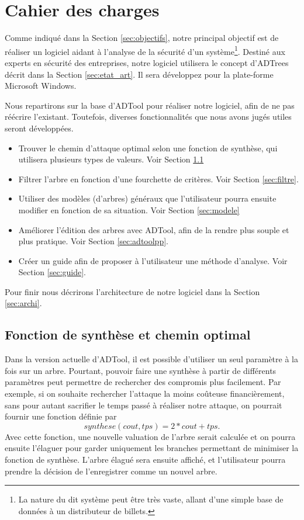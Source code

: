 \section{Cahier des charges}
    \label{sec:cahier}

    Comme indiqué dans la Section \ref{sec:objectifs}, notre principal objectif est de réaliser un logiciel aidant à l'analyse de la sécurité d'un système\footnote{La nature du dit système peut être très vaste, allant d'une simple base de données à un distributeur de billets.}. Destiné aux experts en sécurité des entreprises, notre logiciel utilisera le concept d'ADTrees décrit dans la Section \ref{sec:etat_art}. Il sera développez pour la plate-forme Microsoft Windows.

    Nous repartirons sur la base d'ADTool pour réaliser notre logiciel, afin de ne pas réécrire l'existant. Toutefois, diverses fonctionnalités que nous avons jugés utiles seront développées.
    \begin{itemize}
        \item Trouver le chemin d'attaque optimal selon une fonction de synthèse, qui utilisera plusieurs types de valeurs. Voir Section \ref{sec:fct_synth}
        \item Filtrer l'arbre en fonction d'une fourchette de critères. Voir Section \ref{sec:filtre}.
        \item Utiliser des modèles (d'arbres) généraux que l'utilisateur pourra ensuite modifier en fonction de sa situation. Voir Section \ref{sec:modele}
        \item Améliorer l'édition des arbres avec ADTool, afin de la rendre plus souple et plus pratique. Voir Section \ref{sec:adtoolpp}.
        \item Créer un guide afin de proposer à l'utilisateur une méthode d'analyse. Voir Section \ref{sec:guide}.
    \end{itemize}

    Pour finir nous décrirons l'architecture de notre logiciel dans la Section \ref{sec:archi}.

    \subsection{Fonction de synthèse et chemin optimal}
        \label{sec:fct_synth}

        Dans la version actuelle d'ADTool, il est possible d'utiliser un seul paramètre à la fois sur un arbre. Pourtant, pouvoir faire une synthèse à partir de différents paramètres peut permettre de rechercher des compromis plus facilement.
        Par exemple, si on souhaite rechercher l'attaque la moins coûteuse financièrement, sans pour autant sacrifier le temps passé à réaliser notre attaque, on pourrait fournir une fonction définie par \[ synthese(cout, tps) = 2*cout + tps . \]
        Avec cette fonction, une nouvelle valuation de l'arbre serait calculée et on pourra ensuite l'élaguer pour garder uniquement les branches permettant de minimiser la fonction de synthèse.
        L'arbre élagué sera ensuite affiché, et l'utilisateur pourra prendre la décision de l'enregistrer comme un nouvel arbre.

